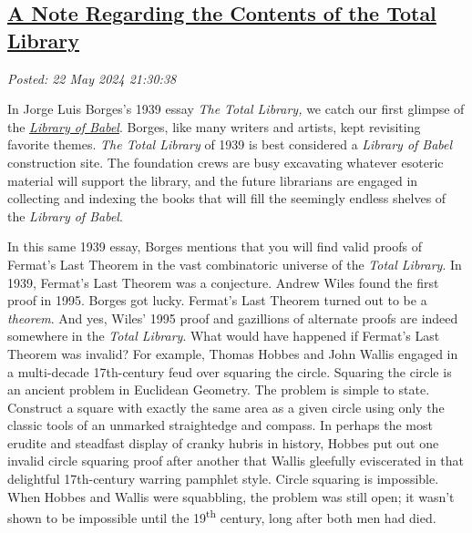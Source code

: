 %

\subsection*{\href{http://analyzethedatanotthedrivel.org/2024/05/22/a-note-regarding-the-contents-of-the-total-library/}{A Note Regarding the Contents of the Total Library}}


\noindent\emph{Posted: 22 May 2024 21:30:38}
\vspace{6pt}

In Jorge Luis Borges's 1939 essay \emph{The Total Library,} we catch our
first glimpse of the \href{https://libraryofbabel.info/}{\emph{Library
of Babel}}. Borges, like many writers and artists, kept revisiting
favorite themes. \emph{The Total Library} of 1939 is best considered a
\emph{Library of Babel} construction site. The foundation crews are busy
excavating whatever esoteric material will support the library, and the
future librarians are engaged in collecting and indexing the books that
will fill the seemingly endless shelves of the \emph{Library of Babel}.

In this same 1939 essay, Borges mentions that you will find valid proofs
of Fermat's Last Theorem in the vast combinatoric universe of the
\emph{Total Library}. In 1939, Fermat's Last Theorem was a conjecture.
Andrew Wiles found the first proof in 1995. Borges got lucky. Fermat's
Last Theorem turned out to be a \emph{theorem}. And yes, Wiles' 1995
proof and gazillions of alternate proofs are indeed somewhere in the
\emph{Total Library}. What would have happened if Fermat's Last Theorem
was invalid? For example, Thomas Hobbes and John Wallis engaged in a
multi-decade 17th-century feud over squaring the circle. Squaring the
circle is an ancient problem in Euclidean Geometry. The problem is
simple to state. Construct a square with exactly the same area as a
given circle using only the classic tools of an unmarked straightedge
and compass. In perhaps the most erudite and steadfast display of cranky
hubris in history, Hobbes put out one invalid circle squaring proof
after another that Wallis gleefully eviscerated in that delightful
17th-century warring pamphlet style. Circle squaring is impossible. When
Hobbes and Wallis were squabbling, the problem was still open; it wasn't
shown to be impossible until the 19\textsuperscript{th} century, long
after both men had died.

